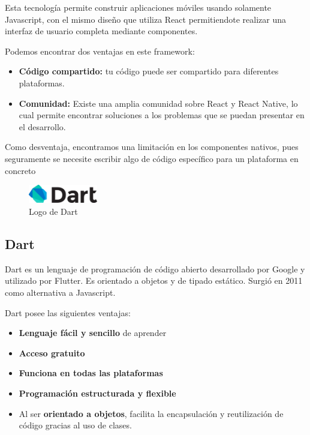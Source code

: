 Esta tecnología permite construir aplicaciones móviles usando solamente Javascript, con el mismo diseño que utiliza
React permitiendote realizar una interfaz de usuario completa mediante componentes. 




Podemos encontrar dos ventajas en este framework:

\begin{itemize}
\item \textbf{Código compartido:} tu código puede ser compartido para diferentes plataformas.
\item \textbf{Comunidad:} Existe una amplia comunidad sobre React y React Native, lo cual permite encontrar soluciones a los problemas que se puedan presentar en el desarrollo.
\end {itemize}

Como desventaja, encontramos una limitación en los componentes nativos, pues seguramente se necesite escribir algo de código
específico para un plataforma en concreto


\begin{figure}
    \vspace*{-0.4cm}

    \centering
    \includegraphics[width=0.27\textwidth]{imagenes/c2/dart.png}
    \caption{Logo de Dart}
\end{figure}\subsection{Dart}
Dart es un lenguaje de programación de código abierto desarrollado por Google y utilizado por Flutter.
Es orientado a objetos y de tipado estático. Surgió en 2011 como alternativa a Javascript.

Dart posee las siguientes ventajas:

\begin{itemize}
\item \textbf{Lenguaje fácil y sencillo} de aprender
\item \textbf{Acceso gratuito}
\item \textbf{Funciona en todas las plataformas}
\item \textbf{Programación estructurada y flexible}
\item Al ser \textbf{orientado a objetos}, facilita la encapsulación y reutilización de código gracias al uso de clases.
 
\end{itemize}

